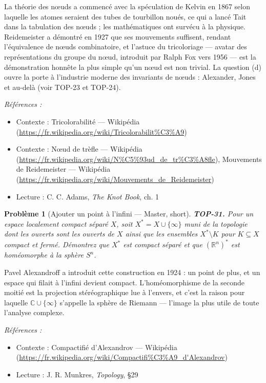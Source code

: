 \documentclass[11pt]{article}
\newtheorem{problem}{Problème}
\newenvironment{refs}{\par\small\noindent\emph{Références :}\begin{itemize}\setlength\itemsep{0pt}}{\end{itemize}\normalsize}
\begin{document}
\noindent La théorie des n\oe{}uds a commencé avec la spéculation de Kelvin en 1867 selon laquelle
les atomes seraient des tubes de tourbillon noués, ce qui a lancé Tait dans la tabulation des n\oe{}uds ; les
mathématiques ont survécu à la physique. Reidemeister a démontré en 1927 que ses mouvements suffisent,
rendant l'équivalence de n\oe{}uds combinatoire, et l'astuce du tricoloriage --- avatar des représentations du
groupe du n\oe{}ud, introduit par Ralph Fox vers 1956 --- est la démonstration honnête la plus simple qu'un n\oe{}ud
est non trivial. La question (d) ouvre la porte à l'industrie moderne des invariants de n\oe{}uds : Alexander,
Jones et au-delà (voir TOP-23 et TOP-24).

\begin{refs}
\item Contexte : Tricolorabilité --- Wikipédia (\url{https://fr.wikipedia.org/wiki/Tricolorabilit%C3%A9})
\item Contexte : N\oe{}ud de trèfle --- Wikipédia (\url{https://fr.wikipedia.org/wiki/N%C5%93ud_de_tr%C3%A8fle}), Mouvements de Reidemeister --- Wikipédia (\url{https://fr.wikipedia.org/wiki/Mouvements_de_Reidemeister})
\item Lecture : C. C. Adams, \textit{The Knot Book}, ch. 1
\end{refs}

\bigskip

\begin{problem}[{Ajouter un point à l'infini --- Master, short}]
\textbf{TOP-31.} Pour un espace localement compact séparé $ X $, soit
$ X^* = X \cup \{\infty\} $ muni de la topologie dont les ouverts sont les ouverts de $ X $ ainsi
que les ensembles $ X^* \setminus K $ pour $ K \subseteq X $ compact et fermé. Démontrez que
$ X^* $ est compact séparé et que $ (\mathbb{R}^n)^* $ est homéomorphe à la sphère
$ S^n $.
\end{problem}

\noindent Pavel Alexandroff a introduit cette construction en 1924 : un point de plus, et un
espace qui filait à l'infini devient compact. L'homéomorphisme de la seconde moitié est la projection
stéréographique lue à l'envers, et c'est la raison pour laquelle $ \mathbb{C} \cup \{\infty\} $
s'appelle la sphère de Riemann --- l'image la plus utile de toute l'analyse complexe.

\begin{refs}
\item Contexte : Compactifié d'Alexandrov --- Wikipédia (\url{https://fr.wikipedia.org/wiki/Compactifi%C3%A9_d'Alexandrov})
\item Lecture : J. R. Munkres, \textit{Topology}, \S{}29
\end{refs}
\end{document}
